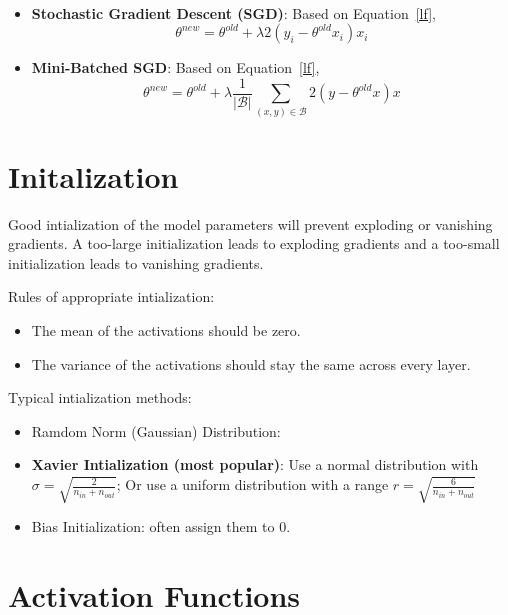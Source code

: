 \documentclass[a4paper]{article}
\begin{document}
\begin{itemize}
\begin{align}
	\end{align}
	\item \textbf{Stochastic Gradient Descent (SGD)}: Based on Equation~\ref{lf},
	\begin{equation}
		{\theta}^{new} = {\theta}^{old} + \lambda 2 (y_i - {\theta}^{old} x_i) x_i
	\end{equation}
	\item \textbf{Mini-Batched SGD}: Based on Equation~\ref{lf},
	\begin{equation}
		{\theta}^{new} = {\theta}^{old} + \lambda \frac{1}{|\mathcal{B}|} \sum_{(x, y) \in \mathcal{B}} 2 (y - {\theta}^{old} x) x
	\end{equation}
\end{itemize}

\section{Initalization}

Good intialization of the model parameters will prevent exploding or vanishing gradients. A too-large initialization leads to exploding gradients and a too-small initialization leads to vanishing gradients.

Rules of appropriate intialization:
\begin{itemize}
	\item The mean of the activations should be zero.
	\item The variance of the activations should stay the same across every layer.
\end{itemize}

Typical intialization methods:
\begin{itemize}
	\item Ramdom Norm (Gaussian) Distribution:
	\item \textbf{Xavier Intialization (most popular)}: Use a normal distribution with $\sigma = \sqrt{\frac{2}{n_{in} + n_{out}}}$; Or use a uniform distribution with a range $r = \sqrt{\frac{6}{n_{in} + n_{out}}}$
	\item Bias Initialization: often assign them to $0$.
\end{itemize}

\section{Activation Functions}
\end{document}
